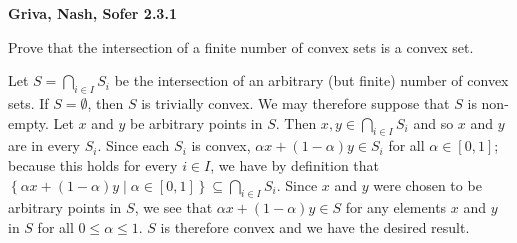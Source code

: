 \textbf{Griva, Nash, Sofer 2.3.1}

Prove that the intersection of a finite number of convex sets is a convex set.

\begin{solution}
  Let $S = \bigcap_{i \in I}{S_i}$ be the intersection of an arbitrary (but finite) number of convex sets.
  If $S = \emptyset$, then $S$ is trivially convex. We may therefore suppose that $S$ is non-empty. Let 
  $x$ and $y$ be arbitrary points in $S$. Then $x, y \in \bigcap_{i \in I}{S_i}$ and so $x$ and $y$ are in every
  $S_i$. Since each $S_i$ is convex, $\alpha x + (1 - \alpha) y \in S_i$ for all $\alpha \in [0, 1]$; because this 
  holds for every $i \in I$, we have by definition that 
  $\left\{ \alpha x + (1 - \alpha) y \mid \alpha \in \left[0, 1\right] \right\} \subseteq \bigcap_{i \in I}{S_i}$.
  Since $x$ and $y$ were chosen to be arbitrary points in $S$, we see that $\alpha x + (1 - \alpha)y \in S$ for any elements
  $x$ and $y$ in $S$ for all $0 \le \alpha \le 1$. $S$ is therefore convex and we have the desired result.
  \ \\
\end{solution}